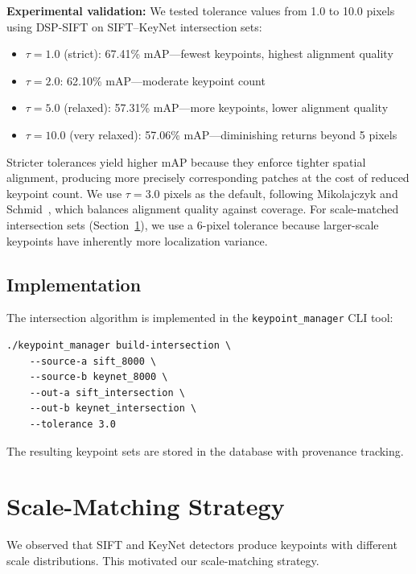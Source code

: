 \textbf{Experimental validation:} We tested tolerance values from 1.0 to 10.0 pixels using DSP-SIFT on SIFT--KeyNet intersection sets:
\begin{itemize}
    \item $\tau = 1.0$ (strict): 67.41\% mAP---fewest keypoints, highest alignment quality
    \item $\tau = 2.0$: 62.10\% mAP---moderate keypoint count
    \item $\tau = 5.0$ (relaxed): 57.31\% mAP---more keypoints, lower alignment quality
    \item $\tau = 10.0$ (very relaxed): 57.06\% mAP---diminishing returns beyond 5 pixels
\end{itemize}
Stricter tolerances yield higher mAP because they enforce tighter spatial alignment, producing more precisely corresponding patches at the cost of reduced keypoint count. We use $\tau = 3.0$ pixels as the default, following Mikolajczyk and Schmid~\cite{mikolajczyk2003evaluation}, which balances alignment quality against coverage. For scale-matched intersection sets (Section~\ref{sec:scale_matching}), we use a 6-pixel tolerance because larger-scale keypoints have inherently more localization variance.

\subsection{Implementation}

The intersection algorithm is implemented in the \texttt{keypoint\_manager} CLI tool:

\begin{verbatim}
./keypoint_manager build-intersection \
    --source-a sift_8000 \
    --source-b keynet_8000 \
    --out-a sift_intersection \
    --out-b keynet_intersection \
    --tolerance 3.0
\end{verbatim}

The resulting keypoint sets are stored in the database with provenance tracking.

\section{Scale-Matching Strategy}
\label{sec:scale_matching}

We observed that SIFT and KeyNet detectors produce keypoints with different scale distributions. This motivated our scale-matching strategy.

